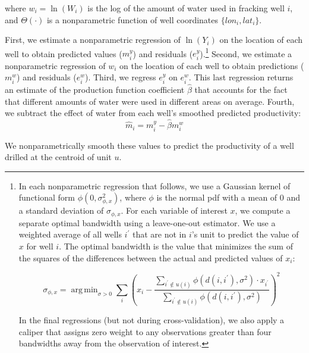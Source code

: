 \documentclass[12pt]{article}
\DeclareMathOperator*{\argmin}{arg\,min}
\begin{document}
\noindent where $w_i = \ln(W_i)$ is the log of the amount of water used in fracking well $i$, and $\Theta(\cdot)$ is a nonparametric function of well coordinates $\{lon_i,lat_i\}$.


First, we estimate a nonparametric regression of $\ln(Y_i)$ on the location of each well to obtain predicted values ($m^y_i$) and residuals ($e^y_i$).\footnote{
	In each nonparametric regression that follows, we use a Gaussian kernel of functional form $\phi(0, \sigma^2_{\phi,x})$, where $\phi$ is the normal pdf with a mean of $0$ and a standard deviation of $\sigma_{\phi,x}$. For each variable of interest $x$, we compute a separate optimal bandwidth using a leave-one-out estimator. We use a weighted average of all wells $i^{\prime}$ that are not in $i$'s unit to predict the value of $x$ for well $i$. The optimal bandwidth is the value that minimizes the sum of the squares of the differences between the actual and predicted values of $x_i$:
	
	\begin{equation}
	\sigma_{\phi,x} = \argmin_{\sigma > 0} \sum_i  \left( x_i -\dfrac{ \sum_{i^{\prime} \notin u(i)} \phi( d(i, i^{\prime}), \sigma^2) \cdot x_{i^{\prime}}  }{ \sum_{i^{\prime} \notin u(i)} \phi( d(i,i^{\prime}), \sigma^2) } \right)^2
	\end{equation}
	
	\noindent In the final regressions (but not during cross-validation), we also apply a caliper that assigns zero weight to any observations greater than four bandwidths away from the observation of interest.

} Second, we estimate a nonparametric regression of $w_i$ on the location of each well to obtain predictions ($m^{w}_i$) and residuals ($e^{w}_i$). Third, we regress $e^y_i$ on $e^{w}_i$.  This last regression returns an estimate of the production function coefficient $\hat{\beta}$ that accounts for the fact that different amounts of water were used in different areas on average. Fourth, we subtract the effect of water from each well's smoothed predicted productivity:
\begin{equation}
\hat{m}_i = m^y_i - \hat{\beta} m^{w}_i
\end{equation}

\noindent We nonparametrically smooth these values to predict the productivity of a well drilled at the centroid of unit $u$.
\end{document}
